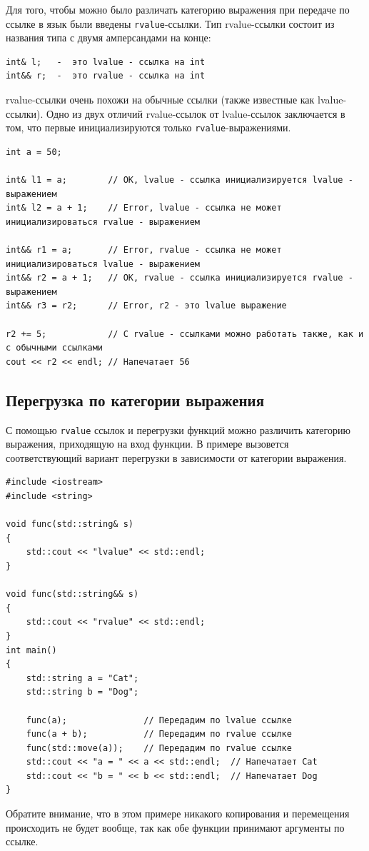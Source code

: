 \documentclass{article}
\begin{document}
Для того, чтобы можно было различать категорию выражения при передаче по ссылке в язык были введены \texttt{rvalue}-ссылки. Тип rvalue-ссылки состоит из названия типа с двумя амперсандами на конце:
\begin{lstlisting}
int& l;   -  это lvalue - ссылка на int
int&& r;  -  это rvalue - ссылка на int
\end{lstlisting}
rvalue-ссылки очень похожи на обычные ссылки (также известные как lvalue-ссылки). Одно из двух отличий rvalue-ссылок от lvalue-ссылок заключается в том, что первые инициализируются только \texttt{rvalue}-выражениями.
\begin{lstlisting}
int a = 50;

int& l1 = a;        // OK, lvalue - ссылка инициализируется lvalue - выражением
int& l2 = a + 1;    // Error, lvalue - ссылка не может инициализироваться rvalue - выражением

int&& r1 = a;       // Error, rvalue - ссылка не может инициализироваться lvalue - выражением
int&& r2 = a + 1;   // OK, rvalue - ссылка инициализируется rvalue - выражением
int&& r3 = r2;      // Error, r2 - это lvalue выражение

r2 += 5;            // С rvalue - ссылками можно работать также, как и с обычными ссылками
cout << r2 << endl; // Напечатает 56
\end{lstlisting}


\subsection*{Перегрузка по категории выражения}
С помощью \texttt{rvalue} ссылок и перегрузки функций можно различить категорию выражения, приходящую на вход функции. В примере вызовется соответствующий вариант перегрузки в зависимости от категории выражения.
\begin{lstlisting}
#include <iostream>
#include <string>

void func(std::string& s)
{
    std::cout << "lvalue" << std::endl;
}

void func(std::string&& s)
{
    std::cout << "rvalue" << std::endl;
}
int main() 
{
    std::string a = "Cat";
    std::string b = "Dog";

    func(a);               // Передадим по lvalue ссылке
    func(a + b);           // Передадим по rvalue ссылке
    func(std::move(a));    // Передадим по rvalue ссылке
    std::cout << "a = " << a << std::endl;  // Напечатает Cat
    std::cout << "b = " << b << std::endl;  // Напечатает Dog
}
\end{lstlisting}
Обратите внимание, что в этом примере никакого копирования и перемещения происходить не будет вообще, так как обе функции принимают аргументы по ссылке.
\end{document}
